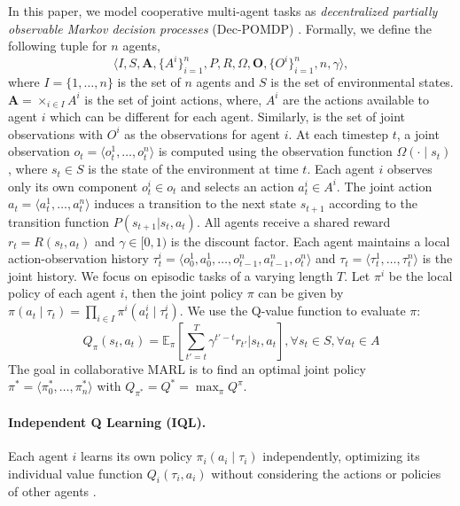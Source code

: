 In this paper, we model cooperative multi-agent tasks as \textit{decentralized partially observable Markov decision processes} (Dec-POMDP) \cite{oliehoek2016concise}. Formally, we define the following tuple for $n$ agents, \[ \langle I, S, \boldsymbol{A}, \{A^i\}^{n}_{i=1}, P, R, \Omega, \boldsymbol{O}, \{O^i\}^{n}_{i=1}, n, \gamma \rangle,\] where $I = \{1, \ldots, n\}$ is the set of $n$ agents and $S$ is the set of environmental states. $\boldsymbol{A} = \times_{i \in I} A^i$ is the set of joint actions, where, $A^i$ are the actions available to agent $i$ which can be different for each agent. Similarly,  is the set of joint observations with $O^i$ as the observations for agent $i$. At each timestep $t$, a joint observation $o_t = \langle o^1_t, \ldots, o^n_t \rangle$ is computed using the observation function $\Omega(\cdot\mid s_t)$, where $s_t \in S$ is the state of the environment at time $t$. Each agent $i$ observes only its own component $o^i_t \in o_t$ and selects an action $a^i_t \in A^i$. The joint action $a_t = \langle a^1_t, \ldots, a^n_t \rangle$ induces a transition to the next state $s_{t+1}$ according to the transition function $P(s_{t+1}|s_t,a_t)$. All agents receive a shared reward $r_t = R(s_t, a_t)$ and $\gamma \in [0, 1)$ is the discount factor. Each agent maintains a local action-observation history $\tau^i_t = \langle o^1_0, a^1_0, \ldots, o^n_{t-1}, a^n_{t-1}, o^n_t \rangle$ and $\tau_t = \langle \tau^1_t, \ldots, \tau^n_t \rangle$ is the joint history. We focus on episodic tasks of a varying length $T$. Let $\pi^i$ be the local policy of each agent $i$, then the joint policy $\pi$ can be given by $\pi(a_t \mid \tau_t) = \prod_{i \in I} \pi^i(a^i_t \mid \tau^i_t)$. We use the Q-value function to evaluate $\pi$:\[Q_{\pi}(s_t, a_t) = \mathbb{E}_{\pi}\left[\sum_{t'=t}^{T} \gamma^{t'-t} r_{t'} \Big\rvert s_t, a_t\right], \forall s_t \in S, \forall a_t \in A\] The goal in collaborative MARL is to find an optimal joint policy $\pi^* = \langle \pi^*_0, \ldots, \pi^*_n \rangle$ with $Q_{\pi^*} = Q^* = \max_{\pi} Q^{\pi}$. 

\paragraph{Independent Q Learning (IQL).} 
Each agent \(i\) learns its own policy \(\pi_i(a_i \mid \tau_i)\) independently, optimizing its individual value function \(Q_i(\tau_i, a_i)\) without considering the actions or policies of other agents \cite{tan1993multi}. 

